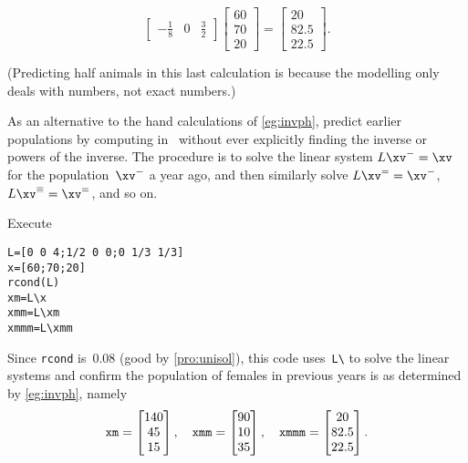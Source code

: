 \begin{example}
\begin{solution}
\begin{itemize}
\begin{equation*}
\begin{bmatrix}
-\frac18&0&\frac32 \end{bmatrix}
\begin{bmatrix} 60\\70\\20 \end{bmatrix}
=\begin{bmatrix} 20\\82.5\\22.5 \end{bmatrix}.
\end{equation*}
\end{itemize}
(Predicting half animals in this last calculation is because the modelling only deals with  numbers, not exact numbers.)
\end{solution}
\end{example}




\begin{example} 
As an alternative to the hand calculations of \cref{eg:invph}, predict earlier populations by computing in \script\ without ever explicitly finding the inverse or powers of the inverse.
The procedure is to solve the linear system \(L\xv^-=\xv\) for the population~\(\xv^-\) a year ago, and then similarly solve \(L\xv^==\xv^-\), \(L\xv^\equiv=\xv^=\), and so on.
\begin{solution} 
Execute
\setbox\ajrqrbox\hbox{}%
\marginajrbox%
\begin{verbatim}
L=[0 0 4;1/2 0 0;0 1/3 1/3]
x=[60;70;20]
rcond(L)
xm=L\x
xmm=L\xm
xmmm=L\xmm
\end{verbatim}
Since \verb|rcond| is~\(0.08\) (good by \cref{pro:unisol}), this code uses~\verb|L\| to solve the linear systems and confirm the population of females in previous years is as determined by \cref{eg:invph}, namely
\begin{equation*}
\verb|xm|=\begin{bmatrix} 140 \\ 45 \\ 15 \end{bmatrix},\quad
\verb|xmm|=\begin{bmatrix} 90 \\ 10 \\ 35 \end{bmatrix},\quad
\verb|xmmm|=\begin{bmatrix} 20 \\ 82.5 \\ 22.5 \end{bmatrix}.
\end{equation*} 
\end{solution}
\end{example}













